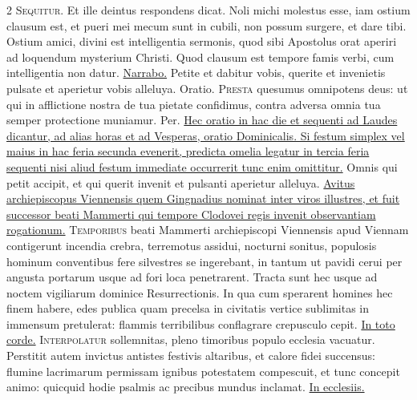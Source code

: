 \begin{multicols*}{2}
\lettrine[lines=2]{\zallmancaps \color{Blue} S}{equitur.} Et ille deintus respondens dicat. Noli
michi molestus esse, iam ostium clausum est, et pueri mei mecum sunt in cubili, non possum surgere, et dare tibi. Ostium amici, divini est intelligentia sermonis, quod sibi Apostolus orat aperiri ad loquendum mysterium Christi. Quod clausum est tempore famis verbi, cum intelligentia non datur. \R \hyperlink{narrabo-nomen}{Narrabo.}
 Petite et dabitur vobis, querite et invenietis pulsate et aperietur vobis alleluya. {\color{Red} Oratio.}
\lettrine[lines=2]{\zallmancaps \color{Blue} P}{resta} quesumus omnipotens deus: ut qui in afflictione nostra de tua pietate confidimus, contra adversa omnia tua semper protectione muniamur. Per.
\newline \ul{Hec oratio in hac die et sequenti ad Laudes dicantur, ad alias horas et ad Vesperas, oratio Dominicalis. Si festum simplex vel maius in hac feria secunda evenerit, predicta omelia legatur in tercia feria sequenti nisi aliud festum immediate occurrerit tunc enim omittitur.}
 Omnis qui petit accipit, et qui querit invenit et pulsanti aperietur alleluya.
\newline \ul{Avitus archiepiscopus Viennensis quem Gingnadius nominat inter viros illustres, et fuit successor beati Mammerti qui tempore Clodovei regis invenit observantiam rogationum.} \grecross %
\lettrine[lines=2]{\zallmancaps \color{Red} T}{emporibus} beati Mammerti archiepiscopi Viennensis apud Viennam contigerunt incendia crebra, terremotus assidui, nocturni sonitus, populosis hominum conventibus fere silvestres se ingerebant, in tantum ut pavidi cerui per angusta portarum usque ad fori loca penetrarent. Tracta sunt hec usque ad noctem vigiliarum dominice Resurrectionis. In qua cum sperarent homines hec finem habere, edes publica quam precelsa in civitatis vertice sublimitas in immensum pretulerat: flammis terribilibus conflagrare crepusculo cepit. \R \hyperlink{in-toto-corde}{In toto corde.}
\lettrine[lines=2]{\zallmancaps \color{Blue} I}{nterpolatur} sollemnitas, pleno timoribus populo ecclesia vacuatur. Perstitit autem invictus antistes festivis altaribus, et calore fidei succensus: flumine lacrimarum permissam ignibus potestatem compescuit, et tunc concepit animo: quicquid hodie psalmis ac precibus mundus inclamat. \R \hyperlink{in-ecclesiis}{In ecclesiis.}

\end{multicols*}
